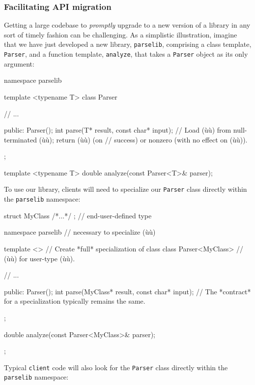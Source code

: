 \subsubsection[Facilitating API migration]{Facilitating API migration}\label{facilitating-api-migration}

Getting a large codebase to \emph{promptly} upgrade to a new version of
a library in any sort of timely fashion can be challenging. As a
simplistic illustration, imagine that we have just developed a new
library, \lstinline!parselib!, comprising a class template, \lstinline!Parser!,
and a function template, \lstinline!analyze!, that takes a \lstinline!Parser!
object as its only argument:

\begin{emcppslisting}[emcppsbatch=e2]
namespace parselib
{
    template <typename T>
    class Parser
    {
        // ...

    public:
        Parser();
        int parse(T* result, const char* input);
            // Load (ù{}ù) from null-terminated (ù{}ù); return (ù{}ù) (on
            // success) or nonzero (with no effect on (ù{}ù)).
    };

    template <typename T>
    double analyze(const Parser<T>& parser);
}
\end{emcppslisting}

\noindent To use our library, clients will need to specialize our \lstinline!Parser!
class directly within the \lstinline!parselib! namespace:

\begin{emcppslisting}[emcppsbatch=e2]
struct MyClass { /*...*/ };  // end-user-defined type

namespace parselib  // necessary to specialize (ù{}ù)
{
    template <>            // Create *full* specialization of class
    class Parser<MyClass>  // (ù{}ù) for user-type (ù{}ù).
    {
        // ...

    public:
        Parser();
        int parse(MyClass* result, const char* input);
            // The *contract* for a specialization typically remains the same.
    };

    double analyze(const Parser<MyClass>& parser);
};
\end{emcppslisting}

\noindent Typical \lstinline!client! code will also look for the \lstinline!Parser!
class directly within the \lstinline!parselib! namespace:

